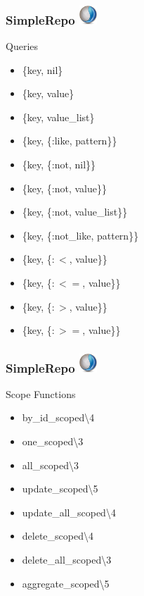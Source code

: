 \documentclass{beamer}
\begin{document}

\begin{frame}[fragile]
\frametitle{SimpleRepo \hfill \includegraphics[width=0.05\textwidth]{recogizer_logo_small.png}}
\centerline{Queries}
\begin{itemize}
\item \{key, nil\}
\item \{key, value\}
\item \{key, value\_list\}
\item \{key, \{:like, pattern\}\}
\item \{key, \{:not, nil\}\}
\item \{key, \{:not, value\}\}
\item \{key, \{:not, value\_list\}\}
\item \{key, \{:not\_like, pattern\}\}
\item \{key, \{$:<$, value\}\}
\item \{key, \{$:<=$, value\}\}
\item \{key, \{$:>$, value\}\}
\item \{key, \{$:>=$, value\}\}
\end{itemize}
\end{frame}


\begin{frame}[fragile]
\frametitle{SimpleRepo \hfill \includegraphics[width=0.05\textwidth]{recogizer_logo_small.png}}
\centerline{Scope Functions}
\begin{itemize}
\item by\_id\_scoped\textbackslash4
\item one\_scoped\textbackslash3
\item all\_scoped\textbackslash3
\item update\_scoped\textbackslash5
\item update\_all\_scoped\textbackslash4
\item delete\_scoped\textbackslash4
\item delete\_all\_scoped\textbackslash3
\item aggregate\_scoped\textbackslash5
\end{itemize}
\end{frame}
\end{document}
